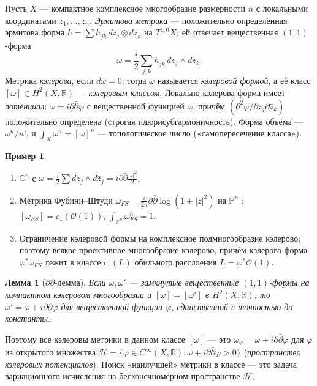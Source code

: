 \documentclass[11pt,a4paper]{article}
\theoremstyle{plain}
\newtheorem{lemma}[theorem]{Лемма}
\theoremstyle{definition}
\newtheorem{example}[theorem]{Пример}
\theoremstyle{remark}
\renewcommand{\C}{\mathbb{C}}
\newcommand{\R}{\mathbb{R}}
\newcommand{\PP}{\mathbb{P}}
\newcommand{\cO}{\mathcal{O}}
\begin{document}
Пусть $X$ --- компактное комплексное многообразие размерности $n$ с локальными координатами
$z_1,\dots,z_n$. \emph{Эрмитова метрика} --- положительно определённая эрмитова форма
$h=\sum h_{j\bar k}\,dz_j\otimes d\bar z_k$ на $T^{1,0}X$; ей отвечает вещественная $(1,1)$-форма
\[
\omega=\frac i2\sum_{j,k}h_{j\bar k}\,dz_j\wedge d\bar z_k .
\]
Метрика \emph{кэлерова}, если $d\omega=0$; тогда $\omega$ называется \emph{кэлеровой формой}, а её
класс $[\omega]\in H^2(X,\R)$ --- \emph{кэлеровым классом}. Локально кэлерова форма имеет
\emph{потенциал}: $\omega=i\partial\bar\partial\varphi$ с вещественной функцией $\varphi$, причём
$(\partial^2\varphi/\partial z_j\partial\bar z_k)$ положительно определена (строгая
плюрисубгармоничность). Форма объёма --- $\omega^n/n!$, и $\int_X\omega^n=[\omega]^n$ --- топологическое
число («самопересечение класса»).

\begin{example}
\begin{enumerate}
\item $\C^n$ с $\omega=\frac i2\sum dz_j\wedge d\bar z_j=i\partial\bar\partial\frac{|z|^2}2$.
\item Метрика Фубини--Штуди $\omega_{FS}=\frac i{2\pi}\partial\bar\partial\log(1+|z|^2)$ на $\PP^n$
\cite[гл.~0]{GH}; $[\omega_{FS}]=c_1(\cO(1))$, $\int_{\PP^n}\omega_{FS}^n=1$.
\item Ограничение кэлеровой формы на комплексное подмногообразие кэлерово; поэтому всякое проективное
многообразие кэлерово, причём кэлерова форма $\varphi^*\omega_{FS}$ лежит в классе $c_1(L)$
обильного расслоения $L=\varphi^*\cO(1)$.
\end{enumerate}
\end{example}

\begin{lemma}[$\partial\bar\partial$-лемма]\label{lem:ddbar}
Если $\omega,\omega'$ --- замкнутые вещественные $(1,1)$-формы на компактном кэлеровом многообразии и
$[\omega]=[\omega']$ в $H^2(X,\R)$, то $\omega'=\omega+i\partial\bar\partial\varphi$ для вещественной
функции $\varphi$, единственной с точностью до константы.
\end{lemma}

Поэтому все кэлеровы метрики в данном классе $[\omega]$ --- это $\omega_\varphi=\omega+i\partial\bar\partial\varphi$
для $\varphi$ из открытого множества
$\mathcal H=\{\varphi\in C^\infty(X,\R):\omega+i\partial\bar\partial\varphi>0\}$ (\emph{пространство
кэлеровых потенциалов}). Поиск «наилучшей» метрики в классе --- это задача вариационного исчисления
на бесконечномерном пространстве $\mathcal H$.
\end{document}
